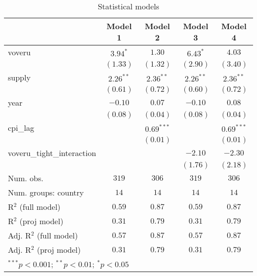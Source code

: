 
\begin{table}
\begin{center}
\begin{tabular}{l c c c c}
\hline
 & Model 1 & Model 2 & Model 3 & Model 4 \\
\hline
voveru                     & $3.94^{*}$  & $1.30$       & $6.43^{*}$  & $4.03$       \\
                           & $(1.33)$    & $(1.32)$     & $(2.90)$    & $(3.40)$     \\
supply                     & $2.26^{**}$ & $2.36^{**}$  & $2.26^{**}$ & $2.36^{**}$  \\
                           & $(0.61)$    & $(0.72)$     & $(0.60)$    & $(0.72)$     \\
year                       & $-0.10$     & $0.07$       & $-0.10$     & $0.08$       \\
                           & $(0.08)$    & $(0.04)$     & $(0.08)$    & $(0.04)$     \\
cpi\_lag                   &             & $0.69^{***}$ &             & $0.69^{***}$ \\
                           &             & $(0.01)$     &             & $(0.01)$     \\
voveru\_tight\_interaction &             &              & $-2.10$     & $-2.30$      \\
                           &             &              & $(1.76)$    & $(2.18)$     \\
\hline
Num. obs.                  & $319$       & $306$        & $319$       & $306$        \\
Num. groups: country       & $14$        & $14$         & $14$        & $14$         \\
R$^2$ (full model)         & $0.59$      & $0.87$       & $0.59$      & $0.87$       \\
R$^2$ (proj model)         & $0.31$      & $0.79$       & $0.31$      & $0.79$       \\
Adj. R$^2$ (full model)    & $0.57$      & $0.87$       & $0.57$      & $0.87$       \\
Adj. R$^2$ (proj model)    & $0.31$      & $0.79$       & $0.31$      & $0.79$       \\
\hline
\multicolumn{5}{l}{\scriptsize{$^{***}p<0.001$; $^{**}p<0.01$; $^{*}p<0.05$}}
\end{tabular}
\caption{Statistical models}
\label{table:coefficients}
\end{center}
\end{table}
